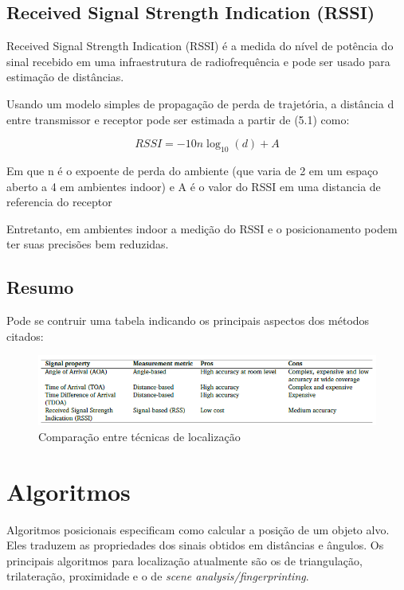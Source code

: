 \subsection{Received Signal Strength Indication (RSSI)}
Received Signal Strength Indication (RSSI) é a medida do nível de potência do sinal recebido em uma infraestrutura de radiofrequência e pode ser usado para estimação de distâncias.

Usando um modelo simples de propagação de perda de trajetória, a distância d entre transmissor e receptor pode ser estimada a partir de (5.1) como:

\begin{equation} \label{eq:1}
RSSI = -10n\log_{10} (d) + A 
\end{equation}

Em que n é o expoente de perda do ambiente (que varia de 2 em um espaço aberto a 4 em ambientes indoor) e A é o valor do RSSI em uma distancia de referencia do receptor

Entretanto, em ambientes indoor a medição do RSSI e o posicionamento podem ter suas precisões bem reduzidas. \cite{art1}

\subsection{Resumo}
Pode se contruir uma tabela indicando os principais aspectos dos métodos citados:

\begin{figure}[H]
	\centering 
	\includegraphics[scale = 1]{images/signal_table.png}
	\caption{Comparação entre técnicas de localização \cite{art1}}
	\label{fig:signal_table.png}
\end{figure}

\section{Algoritmos}

Algoritmos posicionais especificam como calcular a posição de um objeto alvo. Eles traduzem as propriedades dos sinais obtidos em distâncias e ângulos. Os principais algoritmos para localização atualmente são os de triangulação, trilateração, proximidade e o de \textit{scene analysis/fingerprinting}.


